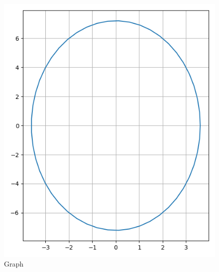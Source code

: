 \documentclass[journal,12pt,twocolumn]{IEEEtran}
\begin{document}
\begin{enumerate}
\begin{figure}[ht]
\includegraphics[width = \columnwidth]{"./figs/fig1.png"}
\caption{Graph}
\label{fig:1}
\end{figure}
\begin{table}[h]
\centering

\caption{}
\label{tab:1}
\end{table}
\end{enumerate}
\end{document}
